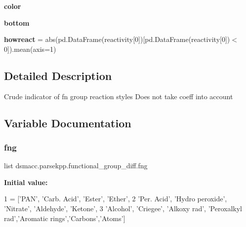 \begin{DoxyCompactItemize}
{\bfseries color}
\item 
\mbox{\label{namespacedsmacc_1_1parsekpp_1_1functional__group__diff_a274747c66a1e2afaf125f529845fa951}} 
{\bfseries bottom}
\item 
\mbox{\label{namespacedsmacc_1_1parsekpp_1_1functional__group__diff_ab4756eb1e0aba06fe696ed5eb65f55ce}} 
{\bfseries howreact} = abs(pd.\+Data\+Frame(reactivity\mbox{[}0\mbox{]})\mbox{[}pd.\+Data\+Frame(reactivity\mbox{[}0\mbox{]})$<$0\mbox{]}).mean(axis=1)
\end{DoxyCompactItemize}


\subsection{Detailed Description}
\begin{DoxyVerb}Crude indicator of fn group reaction styles
Does not take coeff into account
\end{DoxyVerb}
 

\subsection{Variable Documentation}
\mbox{\label{namespacedsmacc_1_1parsekpp_1_1functional__group__diff_a7646faedf5b51fb29de1abc57079fe62}} 
\subsubsection{\texorpdfstring{fng}{fng}}
{\footnotesize\ttfamily list dsmacc.\+parsekpp.\+functional\+\_\+group\+\_\+diff.\+fng}

{\bfseries Initial value\+:}
\begin{DoxyCode}
1 =  [\textcolor{stringliteral}{'PAN'}, \textcolor{stringliteral}{'Carb. Acid'}, \textcolor{stringliteral}{'Ester'}, \textcolor{stringliteral}{'Ether'},
2        \textcolor{stringliteral}{'Per. Acid'}, \textcolor{stringliteral}{'Hydro peroxide'}, \textcolor{stringliteral}{'Nitrate'}, \textcolor{stringliteral}{'Aldehyde'}, \textcolor{stringliteral}{'Ketone'},
3        \textcolor{stringliteral}{'Alcohol'}, \textcolor{stringliteral}{'Criegee'}, \textcolor{stringliteral}{'Alkoxy rad'}, \textcolor{stringliteral}{'Peroxalkyl rad'},\textcolor{stringliteral}{'Aromatic rings'},\textcolor{stringliteral}{'Carbons'},\textcolor{stringliteral}{'Atoms'}]
\end{DoxyCode}

